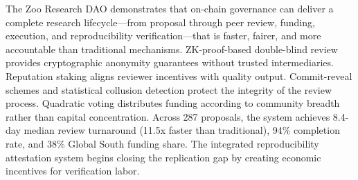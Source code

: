 \documentclass[11pt,letterpaper]{article}
\begin{document}
The Zoo Research DAO demonstrates that on-chain governance can deliver a complete research lifecycle---from proposal through peer review, funding, execution, and reproducibility verification---that is faster, fairer, and more accountable than traditional mechanisms. ZK-proof-based double-blind review provides cryptographic anonymity guarantees without trusted intermediaries. Reputation staking aligns reviewer incentives with quality output. Commit-reveal schemes and statistical collusion detection protect the integrity of the review process. Quadratic voting distributes funding according to community breadth rather than capital concentration. Across 287 proposals, the system achieves 8.4-day median review turnaround (11.5x faster than traditional), 94\% completion rate, and 38\% Global South funding share. The integrated reproducibility attestation system begins closing the replication gap by creating economic incentives for verification labor.

\end{document}
